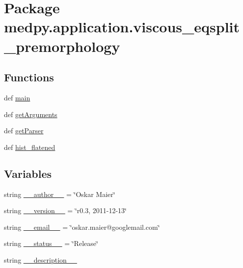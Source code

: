 \hypertarget{namespacemedpy_1_1application_1_1viscous__eqsplit__premorphology}{
\section{Package medpy.application.viscous\_\-eqsplit\_\-premorphology}
\label{namespacemedpy_1_1application_1_1viscous__eqsplit__premorphology}
}
\subsection*{Functions}
\begin{DoxyCompactItemize}
\item 
def \hyperlink{namespacemedpy_1_1application_1_1viscous__eqsplit__premorphology_ae80d5c02d3c6c1d4758f0e543c97c683}{main}
\item 
def \hyperlink{namespacemedpy_1_1application_1_1viscous__eqsplit__premorphology_acfb18354bf67e77649b65fb4617bc639}{getArguments}
\item 
def \hyperlink{namespacemedpy_1_1application_1_1viscous__eqsplit__premorphology_a13492a46da27c3fd34014ed75c0b0055}{getParser}
\item 
def \hyperlink{namespacemedpy_1_1application_1_1viscous__eqsplit__premorphology_adfe516081fc5cdb2666cb8184c013d9d}{hist\_\-flatened}
\end{DoxyCompactItemize}
\subsection*{Variables}
\begin{DoxyCompactItemize}
\item 
string \hyperlink{namespacemedpy_1_1application_1_1viscous__eqsplit__premorphology_a302bbcec463f170359831872cd86fc65}{\_\-\_\-author\_\-\_\-} = \char`\"{}Oskar Maier\char`\"{}
\item 
string \hyperlink{namespacemedpy_1_1application_1_1viscous__eqsplit__premorphology_a401a3d6abb1b8c694dcc10dc58398556}{\_\-\_\-version\_\-\_\-} = \char`\"{}r0.3, 2011-\/12-\/13\char`\"{}
\item 
string \hyperlink{namespacemedpy_1_1application_1_1viscous__eqsplit__premorphology_a5d7738414d3728b1e02f1205303f585c}{\_\-\_\-email\_\-\_\-} = \char`\"{}oskar.maier@googlemail.com\char`\"{}
\item 
string \hyperlink{namespacemedpy_1_1application_1_1viscous__eqsplit__premorphology_a3bbc0b51f05866a25687c0bb95e745e8}{\_\-\_\-status\_\-\_\-} = \char`\"{}Release\char`\"{}
\item 
string \hyperlink{namespacemedpy_1_1application_1_1viscous__eqsplit__premorphology_ab247ec3bad4c99b0909c75dd01d6f6d1}{\_\-\_\-description\_\-\_\-}
\end{DoxyCompactItemize}


